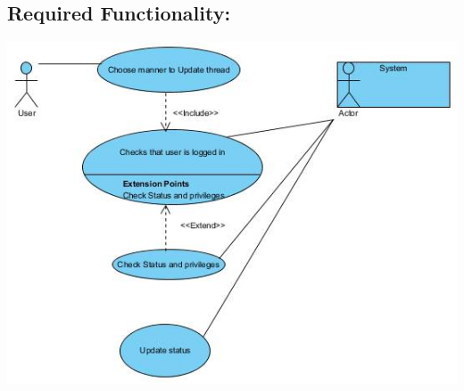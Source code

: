 \documentclass[a4paper,11pt]{article}
\begin{document}
\subsection{Required Functionality:}
\includegraphics[width=1\linewidth]{./Images/CRUDThread/Diagrams/10.jpg}\\
\end{document}

